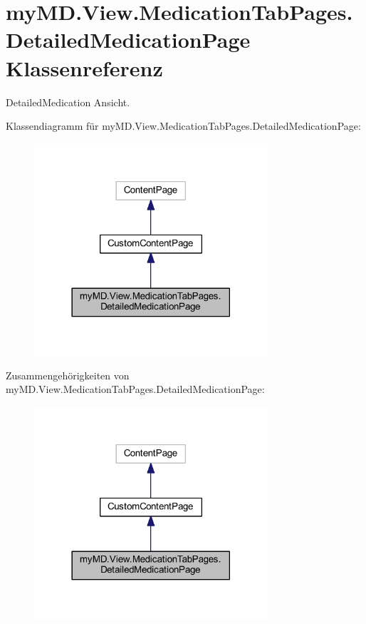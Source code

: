 \hypertarget{classmy_m_d_1_1_view_1_1_medication_tab_pages_1_1_detailed_medication_page}{}\section{my\+M\+D.\+View.\+Medication\+Tab\+Pages.\+Detailed\+Medication\+Page Klassenreferenz}
\label{classmy_m_d_1_1_view_1_1_medication_tab_pages_1_1_detailed_medication_page}


Detailed\+Medication Ansicht.  




Klassendiagramm für my\+M\+D.\+View.\+Medication\+Tab\+Pages.\+Detailed\+Medication\+Page\+:\nopagebreak
\begin{figure}[H]
\begin{center}
\leavevmode
\includegraphics[width=246pt]{classmy_m_d_1_1_view_1_1_medication_tab_pages_1_1_detailed_medication_page__inherit__graph}
\end{center}
\end{figure}


Zusammengehörigkeiten von my\+M\+D.\+View.\+Medication\+Tab\+Pages.\+Detailed\+Medication\+Page\+:\nopagebreak
\begin{figure}[H]
\begin{center}
\leavevmode
\includegraphics[width=246pt]{classmy_m_d_1_1_view_1_1_medication_tab_pages_1_1_detailed_medication_page__coll__graph}
\end{center}
\end{figure}
